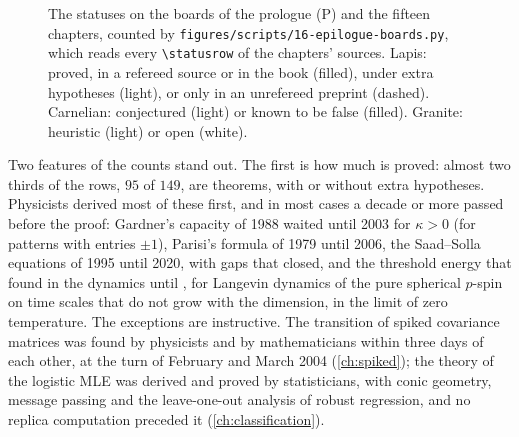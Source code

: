 \begin{refsection}
\begin{figure}[t]
\centering
{}
\caption{The statuses on the boards of the prologue (P) and the fifteen chapters, counted by \texttt{figures/scripts/16-epilogue-boards.py}, which reads every \texttt{\textbackslash statusrow} of the chapters' sources. Lapis: proved, in a refereed source or in the book (filled), under extra hypotheses (light), or only in an unrefereed preprint (dashed). Carnelian: conjectured (light) or known to be false (filled). Granite: heuristic (light) or open (white).}\label{fig:epilogue:boards}
\end{figure}

Two features of the counts stand out. The first is how much is proved: almost two thirds of the rows, $95$ of $149$, are theorems, with or without extra hypotheses. Physicists derived most of these first, and in most cases a decade or more passed before the proof: Gardner's capacity of 1988 waited until 2003 for $\kappa>0$ (for patterns with entries $\pm1$), Parisi's formula of 1979 until 2006, the Saad--Solla equations of 1995 until 2020, with gaps that \textcite{VeigaEtAl2022} closed, and the threshold energy that \textcite{CugliandoloKurchan1993} found in the dynamics until \textcite{Sellke2024}, for Langevin dynamics of the pure spherical $p$-spin on time scales that do not grow with the dimension, in the limit of zero temperature. The exceptions are instructive. The transition of spiked covariance matrices was found by physicists \parencite{HoyleRattray2004} and by mathematicians \parencite{BaikBenArousPeche2005} within three days of each other, at the turn of February and March 2004 (\cref{ch:spiked}); the theory of the logistic MLE was derived and proved by statisticians, with conic geometry, message passing and the leave-one-out analysis of robust regression, and no replica computation preceded it (\cref{ch:classification}).


\end{refsection}

